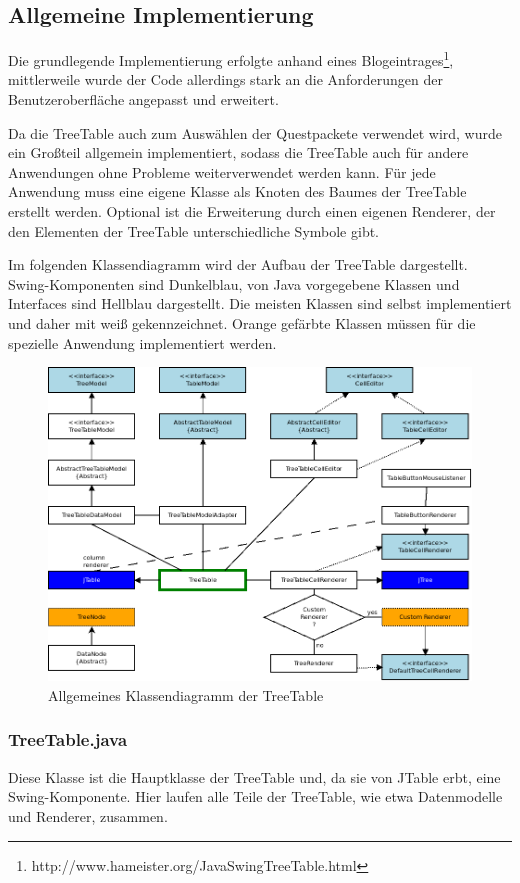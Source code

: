 \subsection{Allgemeine Implementierung}
Die grundlegende Implementierung erfolgte anhand eines Blogeintrages\footnote{http://www.hameister.org/JavaSwingTreeTable.html}, mittlerweile wurde der Code allerdings stark an die Anforderungen der Benutzeroberfläche angepasst und erweitert.

Da die TreeTable auch zum Auswählen der Questpackete verwendet wird, wurde ein Großteil allgemein implementiert, sodass die TreeTable auch für andere Anwendungen ohne Probleme weiterverwendet werden kann. Für jede Anwendung muss eine eigene Klasse als Knoten des Baumes der TreeTable erstellt werden. Optional ist die Erweiterung durch einen eigenen Renderer, der den Elementen der TreeTable unterschiedliche Symbole gibt.

Im folgenden Klassendiagramm wird der Aufbau der TreeTable dargestellt. Swing-Komponenten sind Dunkelblau, von Java vorgegebene Klassen und Interfaces sind Hellblau dargestellt. Die meisten Klassen sind selbst implementiert und daher mit weiß gekennzeichnet. Orange gefärbte Klassen müssen für die spezielle Anwendung implementiert werden.

\begin{figure}
\includegraphics[width=\textwidth]{./media/images/gui/var/TreeTableClassesRaw.png}
\caption{Allgemeines Klassendiagramm der TreeTable}
\label{fig:deb-var-tt-class-raw}
\end{figure}

\subsubsection*{TreeTable.java}
Diese Klasse ist die Hauptklasse der TreeTable und, da sie von JTable erbt, eine Swing-Komponente. Hier laufen alle Teile der TreeTable, wie etwa Datenmodelle und Renderer, zusammen.


